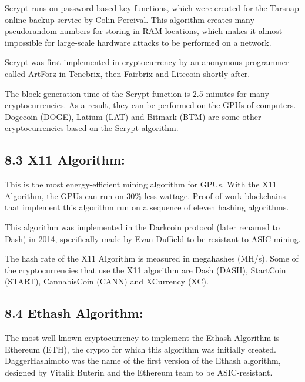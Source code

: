 Scrypt runs on password-based key functions, which were created for the Tarsnap online backup service by Colin Percival. This algorithm creates many pseudorandom numbers for storing in RAM locations, which makes it almost impossible for large-scale hardware attacks to be performed on a network.\vspace{.3 cm}

Scrypt was first implemented in cryptocurrency by an anonymous programmer called ArtForz in Tenebrix, then Fairbrix and Litecoin shortly after.\vspace{.3 cm}

The block generation time of the Scrypt function is 2.5 minutes for many cryptocurrencies. As a result, they can be performed on the GPUs of computers. Dogecoin (DOGE), Latium (LAT) and Bitmark (BTM) are some other cryptocurrencies based on the Scrypt algorithm. \vspace{.3 cm}

\subsection*{8.3 X11 Algorithm:}
This is the most energy-efficient mining algorithm for GPUs. With the X11 Algorithm, the GPUs can run on 30\% less wattage. Proof-of-work blockchains that implement this algorithm run on a sequence of eleven hashing algorithms. \vspace{.3 cm}

This algorithm was implemented in the Darkcoin protocol (later renamed to Dash) in 2014, specifically made by Evan Duffield to be resistant to ASIC mining.\vspace{.3 cm}

The hash rate of the X11 Algorithm is measured in megahashes (MH/s). Some of the cryptocurrencies that use the X11 algorithm are Dash (DASH), StartCoin (START), CannabisCoin (CANN) and XCurrency (XC).\vspace{.3 cm}

\subsection*{8.4 Ethash Algorithm:}
The most well-known cryptocurrency to implement the Ethash Algorithm is Ethereum (ETH), the crypto for which this algorithm was initially created. DaggerHashimoto was the name of the first version of the Ethash algorithm, designed by Vitalik Buterin and the Ethereum team to be ASIC-resistant.\vspace{.3 cm} 

